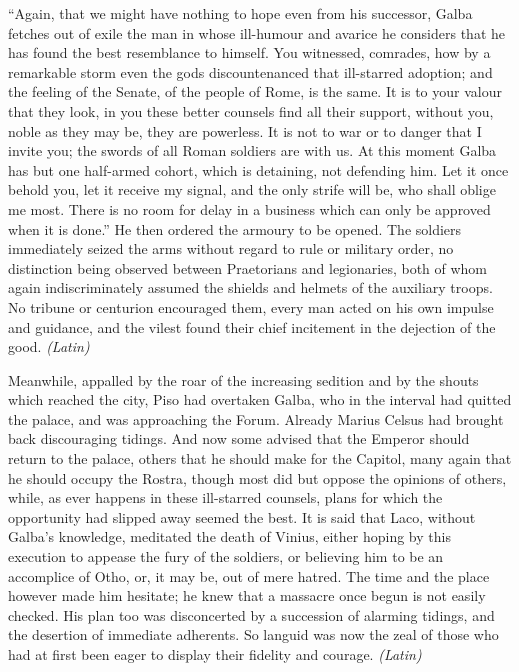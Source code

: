 ``Again, that we might have nothing to hope even from his successor, Galba fetches out of exile the man in whose ill-humour and avarice he considers that he has found the best resemblance to himself. You witnessed, comrades, how by a remarkable storm even the gods discountenanced that ill-starred adoption; and the feeling of the Senate, of the people of Rome, is the same. It is to your valour that they look, in you these better counsels find all their support, without you, noble as they may be, they are powerless. It is not to war or to danger that I invite you; the swords of all Roman soldiers are with us. At this moment Galba has but one half-armed cohort, which is detaining, not defending him. Let it once behold you, let it receive my signal, and the only strife will be, who shall oblige me most. There is no room for delay in a business which can only be approved when it is done.'' He then ordered the armoury to be opened. The soldiers immediately seized the arms without regard to rule or military order, no distinction being observed between Praetorians and legionaries, both of whom again indiscriminately assumed the shields and helmets of the auxiliary troops. No tribune or centurion encouraged them, every man acted on his own impulse and guidance, and the vilest found their chief incitement in the dejection of the good. \emph{(Latin)}


Meanwhile, appalled by the roar of the increasing sedition and by the shouts which reached the city, Piso had overtaken Galba, who in the interval had quitted the palace, and was approaching the Forum. Already Marius Celsus had brought back discouraging tidings. And now some advised that the Emperor should return to the palace, others that he should make for the Capitol, many again that he should occupy the Rostra, though most did but oppose the opinions of others, while, as ever happens in these ill-starred counsels, plans for which the opportunity had slipped away seemed the best. It is said that Laco, without Galba's knowledge, meditated the death of Vinius, either hoping by this execution to appease the fury of the soldiers, or believing him to be an accomplice of Otho, or, it may be, out of mere hatred. The time and the place however made him hesitate; he knew that a massacre once begun is not easily checked. His plan too was disconcerted by a succession of alarming tidings, and the desertion of immediate adherents. So languid was now the zeal of those who had at first been eager to display their fidelity and courage. \emph{(Latin)}


